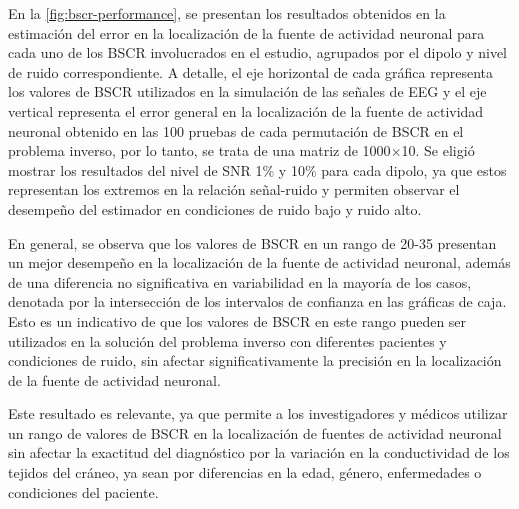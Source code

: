 En la \cref{fig:bscr-performance}, se presentan los resultados obtenidos en la estimación del error en la localización de la fuente de actividad neuronal para cada uno de los BSCR involucrados en el estudio, agrupados por el dipolo y nivel de ruido correspondiente.
A detalle, el eje horizontal de cada gráfica representa los valores de BSCR utilizados en la simulación de las señales de EEG y el eje vertical representa el error general en la localización de la fuente de actividad neuronal obtenido en las 100 pruebas de cada permutación de BSCR en el problema inverso, por lo tanto, se trata de una matriz de 1000$\times$10.
Se eligió mostrar los resultados del nivel de SNR 1\% y 10\% para cada dipolo, ya que estos representan los extremos en la relación señal-ruido y permiten observar el desempeño del estimador en condiciones de ruido bajo y ruido alto.

En general, se observa que los valores de BSCR en un rango de 20-35 presentan un mejor desempeño en la localización de la fuente de actividad neuronal, además de una diferencia no significativa en variabilidad en la mayoría de los casos, denotada por la intersección de los intervalos de confianza en las gráficas de caja.
Esto es un indicativo de que los valores de BSCR en este rango pueden ser utilizados en la solución del problema inverso con diferentes pacientes y condiciones de ruido, sin afectar significativamente la precisión en la localización de la fuente de actividad neuronal.

Este resultado es relevante, ya que permite a los investigadores y médicos utilizar un rango de valores de BSCR en la localización de fuentes de actividad neuronal sin afectar la exactitud del diagnóstico por la variación en la conductividad de los tejidos del cráneo, ya sean por diferencias en la edad, género, enfermedades o condiciones del paciente.

